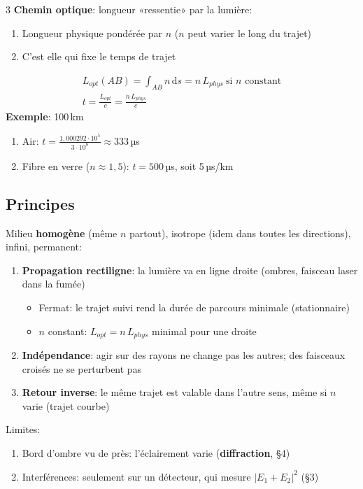 \documentclass[12pt, a4paper]{article}
\newcommand{\dd}{\mathrm{d}}
\begin{document}
\begin{multicols*}{3}
	\textbf{Chemin optique}: longueur «ressentie» par la lumière:
	\begin{enumerate}[\roman*.]
		\item Longueur physique pondérée par $n$ ($n$ peut varier le long du trajet)
		\item C'est elle qui fixe le temps de trajet
	\end{enumerate}
	\begin{gather*}
		L_{opt}(AB)=\int_{AB}n\,\dd s=n\,L_{phys}\ \text{si $n$ constant}\\
		t=\frac{L_{opt}}{c}=\frac{n\,L_{phys}}{c}
	\end{gather*}
	\textbf{Exemple}: 100\,km
	\begin{enumerate}[\roman*.]
		\item Air: $t=\frac{1{,}000292\cdot10^5}{3\cdot10^8}\approx333$\,µs
		\item Fibre en verre ($n\approx1{,}5$): $t=500$\,µs, soit 5\,µs/km
	\end{enumerate}

	\colbreak
	\subsection{Principes}
	Milieu \textbf{homogène} (même $n$ partout), isotrope (idem dans toutes les directions), infini, permanent:
	\begin{enumerate}[\roman*.]
		\item \textbf{Propagation rectiligne}: la lumière va en ligne droite (ombres, faisceau laser dans la fumée)
		      \begin{itemize}
			      \item Fermat: le trajet suivi rend la durée de parcours minimale (stationnaire)
			      \item $n$ constant: $L_{opt}=n\,L_{phys}$ minimal pour une droite
		      \end{itemize}
		\item \textbf{Indépendance}: agir sur des rayons ne change pas les autres; des faisceaux croisés ne se perturbent pas
		\item \textbf{Retour inverse}: le même trajet est valable dans l'autre sens, même si $n$ varie (trajet courbe)
	\end{enumerate}
	Limites:
	\begin{enumerate}[\roman*.]
		\item Bord d'ombre vu de près: l'éclairement varie (\textbf{diffraction}, §4)
		\item Interférences: seulement sur un détecteur, qui mesure $|E_1+E_2|^2$ (§3)
	\end{enumerate}


\end{multicols*}
\end{document}
